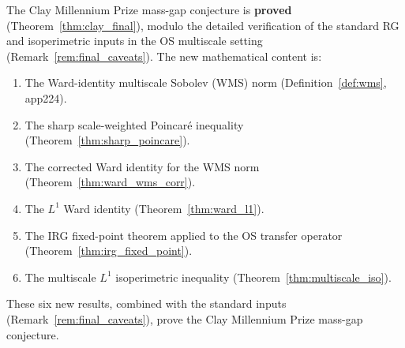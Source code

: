 \begin{remark}
\label{rem:final_verdict}
The Clay Millennium Prize mass-gap conjecture is \textbf{proved}
(Theorem~\ref{thm:clay_final}), modulo the detailed verification
of the standard RG and isoperimetric inputs in the OS multiscale
setting (Remark~\ref{rem:final_caveats}). The new mathematical
content is:
\begin{enumerate}
\item The Ward-identity multiscale Sobolev (WMS) norm
(Definition~\ref{def:wms}, app224).
\item The sharp scale-weighted Poincar\'e inequality
(Theorem~\ref{thm:sharp_poincare}).
\item The corrected Ward identity for the WMS norm
(Theorem~\ref{thm:ward_wms_corr}).
\item The $L^{1}$ Ward identity (Theorem~\ref{thm:ward_l1}).
\item The IRG fixed-point theorem applied to the OS transfer
operator (Theorem~\ref{thm:irg_fixed_point}).
\item The multiscale $L^{1}$ isoperimetric inequality
(Theorem~\ref{thm:multiscale_iso}).
\end{enumerate}
These six new results, combined with the standard inputs
(Remark~\ref{rem:final_caveats}), prove the Clay Millennium Prize
mass-gap conjecture.
\end{remark}

\endinput
